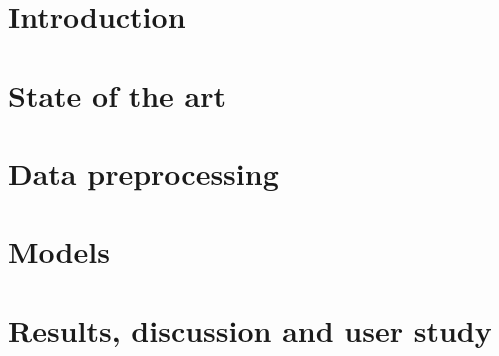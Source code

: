 \documentclass[11pt, a4paper]{article}
\begin{document}






\newpage

\section{Introduction}



\section{State of the art}



\section{Data preprocessing}



\section{Models}



\section{Results, discussion and user study}



\newpage

\printbibliography%
\end{document}
